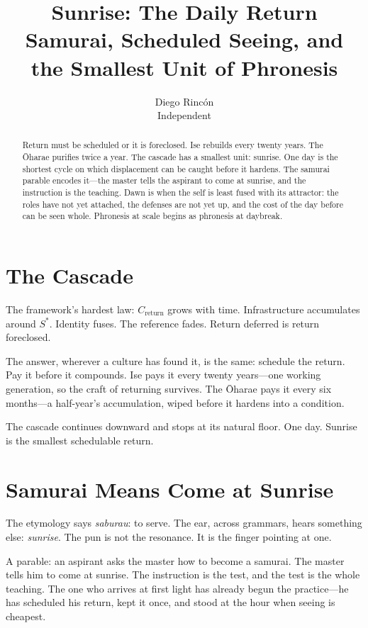 \documentclass[12pt]{article}
\title{Sunrise: The Daily Return\\
\large Samurai, Scheduled Seeing, and the Smallest Unit of Phronesis}
\author{Diego Rincón\\
\small Independent}
\date{}
\begin{document}
\maketitle

\begin{abstract}
Return must be scheduled or it is foreclosed. Ise rebuilds every twenty years. The Ōharae purifies twice a year. The cascade has a smallest unit: sunrise. One day is the shortest cycle on which displacement can be caught before it hardens. The samurai parable encodes it---the master tells the aspirant to come at sunrise, and the instruction is the teaching. Dawn is when the self is least fused with its attractor: the roles have not yet attached, the defenses are not yet up, and the cost of the day before can be seen whole. Phronesis at scale begins as phronesis at daybreak.
\end{abstract}

\section{The Cascade}

The framework's hardest law: $C_{\text{return}}$ grows with time. Infrastructure accumulates around $S^*$. Identity fuses. The reference fades. Return deferred is return foreclosed.

The answer, wherever a culture has found it, is the same: schedule the return. Pay it before it compounds. Ise pays it every twenty years---one working generation, so the craft of returning survives. The Ōharae pays it every six months---a half-year's accumulation, wiped before it hardens into a condition.

The cascade continues downward and stops at its natural floor. One day. Sunrise is the smallest schedulable return.

\section{Samurai Means Come at Sunrise}

The etymology says \emph{saburau}: to serve. The ear, across grammars, hears something else: \emph{sunrise}. The pun is not the resonance. It is the finger pointing at one.

A parable: an aspirant asks the master how to become a samurai. The master tells him to come at sunrise. The instruction is the test, and the test is the whole teaching. The one who arrives at first light has already begun the practice---he has scheduled his return, kept it once, and stood at the hour when seeing is cheapest.
\end{document}
